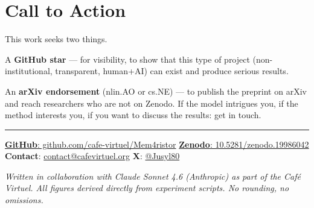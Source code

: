 \documentclass[11pt, a4paper]{article}
\begin{document}
\section{Call to Action}

This work seeks two things.

A \textbf{GitHub star} --- for visibility, to show that this type of project (non-institutional,
transparent, human+AI) can exist and produce serious results.

An \textbf{arXiv endorsement} (nlin.AO or cs.NE) --- to publish the preprint on arXiv and reach
researchers who are not on Zenodo. If the model intrigues you, if the method interests you, if you
want to discuss the results: get in touch.

\vspace{0.5em}
\color{rulecol}\rule{\linewidth}{0.5pt}\color{black}
\vspace{0.3em}

\begin{center}
\small
\href{https://github.com/cafe-virtuel/Mem4ristor}{\textbf{GitHub}: github.com/cafe-virtuel/Mem4ristor}
\quad\textbar\quad
\href{https://doi.org/10.5281/zenodo.19986042}{\textbf{Zenodo}: 10.5281/zenodo.19986042}
\quad\textbar\quad
\textbf{Contact}: \href{mailto:contact@cafevirtuel.org}{contact@cafevirtuel.org}
\quad\textbar\quad
\textbf{X}: \href{https://x.com/Jusyl80}{@Jusyl80}
\end{center}

\vspace{0.3em}
{\small\color{muted}\textit{Written in collaboration with Claude Sonnet 4.6 (Anthropic) as part of the Café Virtuel.
All figures derived directly from experiment scripts. No rounding, no omissions.}}
\end{document}
